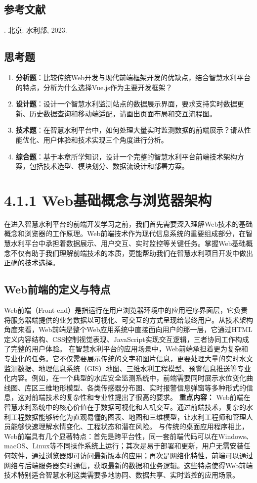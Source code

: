 \subsection{参考文献}\label{ux53c2ux8003ux6587ux732e} . 北京: 水利部, 2023. \subsection{思考题}\label{ux601dux8003ux9898}
\begin{enumerate} \def\labelenumi{\arabic{enumi}.} \item
\textbf{分析题}：比较传统Web开发与现代前端框架开发的优缺点，结合智慧水利平台的特点，分析为什么选择Vue.js作为主要开发框架？ \item
\textbf{设计题}：设计一个智慧水利监测站点的数据展示界面，要求支持实时数据更新、历史数据查询和移动端适配，请画出页面布局和交互流程图。 \item
\textbf{技术题}：在智慧水利平台中，如何处理大量实时监测数据的前端展示？请从性能优化、用户体验和技术实现三个角度进行分析。 \item
\textbf{综合题}：基于本章所学知识，设计一个完整的智慧水利平台前端技术架构方案，包括技术选型、模块划分、数据流设计和部署方案。 \end{enumerate} \section{4.1.1
Web基础概念与浏览器架构}\label{webux57faux7840ux6982ux5ff5ux4e0eux6d4fux89c8ux5668ux67b6ux6784}
在进入智慧水利平台的前端开发学习之前，我们首先需要深入理解Web技术的基础概念和浏览器的工作原理。Web前端技术作为现代信息系统的重要组成部分，在智慧水利平台中承担着数据展示、用户交互、实时监控等关键任务。掌握Web基础概念不仅有助于我们理解前端技术的本质，更能帮助我们在智慧水利项目开发中做出正确的技术选择。
\subsection{Web前端的定义与特点}\label{webux524dux7aefux7684ux5b9aux4e49ux4e0eux7279ux70b9}
Web前端（Front-end）是指运行在用户浏览器环境中的应用程序界面层，它负责将服务器端提供的业务数据以可视化、可交互的方式呈现给最终用户。从技术架构角度来看，Web前端是整个Web应用系统中直接面向用户的那一层，它通过HTML定义内容结构、CSS控制视觉表现、JavaScript实现交互逻辑，三者协同工作构成了完整的用户体验。
在智慧水利平台的应用场景中，Web前端承担着更为复杂和专业化的任务。它不仅需要展示传统的文字和图片信息，更要处理大量的实时水文监测数据、地理信息系统（GIS）地图、三维水利工程模型、预警信息推送等专业化内容。例如，在一个典型的水库安全监测系统中，前端需要同时展示水位变化曲线图、库区三维地形模型、各类传感器分布图、实时报警信息弹窗等多种形式的信息，这对前端技术的复杂性和专业性提出了很高的要求。
\textbf{重点内容：} Web前端在智慧水利系统中的核心价值在于数据可视化和人机交互。通过前端技术，复杂的水利工程数据能够转化为直观易懂的图表、地图和三维模型，让水利工程师和管理人员能够快速理解水情变化、工程状态和潜在风险。
与传统的桌面应用程序相比，Web前端具有几个显著特点：首先是跨平台性，同一套前端代码可以在Windows、macOS、Linux等不同操作系统上运行；其次是易于部署和更新，用户无需安装任何软件，通过浏览器即可访问最新版本的应用；再次是网络化特性，前端可以通过网络与后端服务器实时通信，获取最新的数据和业务逻辑。这些特点使得Web前端技术特别适合智慧水利这类需要多地协同、数据共享、实时监控的应用场景。
